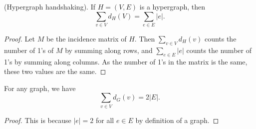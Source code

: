 \begin{theorem}
	(Hypergraph handshaking). If \( H=(V,E) \) is a hypergraph, then \[
		\sum_{v \in V} d_H(V) = \sum_{e \in E}|e|
	.\] 
\end{theorem}
\begin{proof}
	Let \( M \) be the incidence matrix of \( H \). Then \( \sum_{v \in V} d_H(v) \) counts the number of 1's of \( M \) by summing along rows, and \( \sum_{e \in E}|e| \) counts the number of 1's by summing along columns. As the number of 1's in the matrix is the same, these two values are the same.
\end{proof}

\begin{corollary}
	For any graph, we have \[
		\sum_{v \in V}d_G(v) = 2 |E|
	.\] 
\end{corollary}
\begin{proof}
	This is because \( |e|=2 \) for all \( e \in E \) by definition of a graph.
\end{proof}
